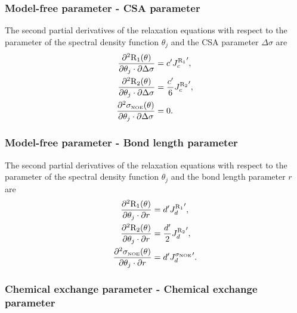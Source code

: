 \subsubsection{Model-free parameter - CSA parameter}

The second partial derivatives of the relaxation equations with respect to the parameter of the spectral density function $\theta_j$ and the CSA parameter $\Delta\sigma$ are
\begin{align}
    \frac{\partial^2 \mathrm{R}_1(\theta)}{\partial \theta_j \cdot \partial \Delta\sigma} &= c' {J_c^{\mathrm{R}_1}}',            \label{eq: Ri': d2R1/dmfj.dCSA} \\
    \frac{\partial^2 \mathrm{R}_2(\theta)}{\partial \theta_j \cdot \partial \Delta\sigma} &= \frac{c'}{6} {J_c^{\mathrm{R}_2}}',  \label{eq: Ri': d2R2/dmfj.dCSA} \\
    \frac{\partial^2 \sigma_{\scriptscriptstyle \mathrm{NOE}}(\theta)}{\partial \theta_j \cdot \partial \Delta\sigma} &= 0.                   \label{eq: Ri': d2sigmaNOE/dmfj.dCSA}
\end{align}


\subsubsection{Model-free parameter - Bond length parameter}

The second partial derivatives of the relaxation equations with respect to the parameter of the spectral density function $\theta_j$ and the bond length parameter $r$ are
\begin{align}
    \frac{\partial^2 \mathrm{R}_1(\theta)}{\partial \theta_j \cdot \partial r} &= d' {J_d^{\mathrm{R}_1}}',               \label{eq: Ri': d2R1/dmfj.dr} \\
    \frac{\partial^2 \mathrm{R}_2(\theta)}{\partial \theta_j \cdot \partial r} &= \frac{d'}{2} {J_d^{\mathrm{R}_2}}',     \label{eq: Ri': d2R2/dmfj.dr} \\
    \frac{\partial^2 \sigma_{\scriptscriptstyle \mathrm{NOE}}(\theta)}{\partial \theta_j \cdot \partial r} &= d' {J_d^{\sigma_{\scriptscriptstyle \mathrm{NOE}}}}'. \label{eq: Ri': d2sigmaNOE/dmfj.dr}
\end{align}


\subsubsection{Chemical exchange parameter - Chemical exchange parameter}

